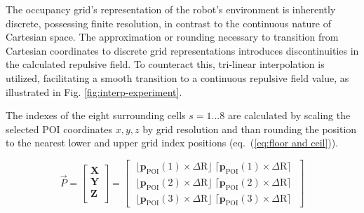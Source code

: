 \documentclass[letterpaper, 10 pt, conference]{ieeeconf}  %
\begin{document}
The occupancy grid's representation of the robot's environment is inherently discrete, possessing finite resolution, in contrast to the continuous nature of Cartesian space. The approximation or rounding necessary to transition from Cartesian coordinates to discrete grid representations introduces discontinuities in the calculated repulsive field. To counteract this, tri-linear interpolation is utilized, facilitating a smooth transition to a continuous repulsive field value, as illustrated in Fig. \ref{fig:interp-experiment}.


The indexes of the eight surrounding cells $s=1...8$ are calculated by scaling the selected POI coordinates $x,y,z$ by grid resolution and than rounding the position to the nearest lower and upper grid index positions (eq.~(\ref{eq:floor and ceil})).

\begin{equation}
	\label{eq:floor and ceil}
	\vec{P} =
	\begin{bmatrix}
		\mathbf{X} \\
		\mathbf{Y} \\
		\mathbf{Z} \\
	\end{bmatrix}
	=
	\begin{bmatrix}
		\; \lfloor \mathbf{p}_{\mathrm{POI}}(1) \times\Delta \mathrm{R} \rfloor \; \lceil \mathbf{p}_{\mathrm{POI}}(1) \times\Delta \mathrm{R} \rceil \;  \\
		\; \lfloor \mathbf{p}_{\mathrm{POI}}(2) \times\Delta \mathrm{R} \rfloor \; \lceil \mathbf{p}_{\mathrm{POI}}(2) \times\Delta \mathrm{R} \rceil \; \\
		\; \lfloor \mathbf{p}_{\mathrm{POI}}(3) \times\Delta \mathrm{R} \rfloor \; \lceil \mathbf{p}_{\mathrm{POI}}(3) \times\Delta \mathrm{R} \rceil \; 
	\end{bmatrix}
\end{equation}
\end{document}
